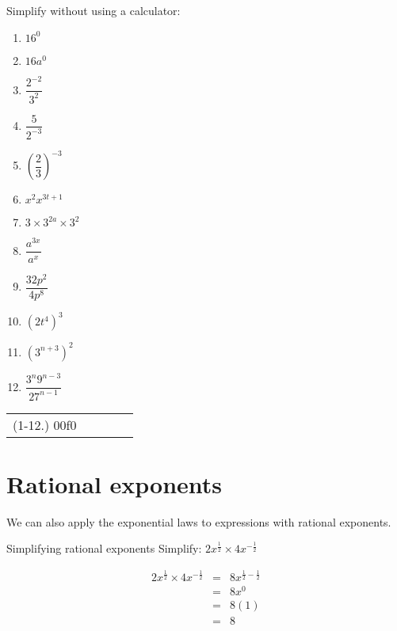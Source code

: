 \begin{exercises}{}{Simplify without using a calculator:
\begin{multicols}{2}
\begin{enumerate}[label=\textbf{\arabic*}., itemsep=5pt]
 \item $16^0$
 \item $16a^0$
 \item $\dfrac{2^{-2}}{3^2}$
 \item $ \dfrac{5}{2^{-3}}$
 \item $ \left(\dfrac{2}{3}\right)^{-3} $
 \item $ x^2 x^{3t+1} $
 \item $ 3 \times 3^{2a} \times 3^2$
 \item $ \dfrac{a^{3x}}{a^x} $
 \item $ \dfrac{32p^2}{4p^8}$
 \item $ (2t^4)^3$
 \item $ (3^{n+3})^2$
 \item $ \dfrac{3^n 9^{n-3}}{27^{n-1}}$
\end{enumerate}
\end{multicols}
\practiceinfo
\par
\begin{tabular}[h]{ccccc}
(1-12.) 00f0\end{tabular}
}
\end{exercises}

\section{Rational exponents}

We can also apply the exponential laws to expressions with rational exponents.
\par
{}

\begin{wex}
{Simplifying rational exponents}
{Simplify: $2x^{\frac{1}{2}}\times 4x^{-\frac{1}{2}}$}
{

\begin{eqnarray*}
 2x^{\frac{1}{2}} \times 4x^{-\frac{1}{2}} & = & 8x^{\frac{1}{2}-\frac{1}{2}} \\
					  & = & 8x^0 \\
					  & = & 8(1) \\
					  & = & 8 
\end{eqnarray*}
}
\end{wex}


